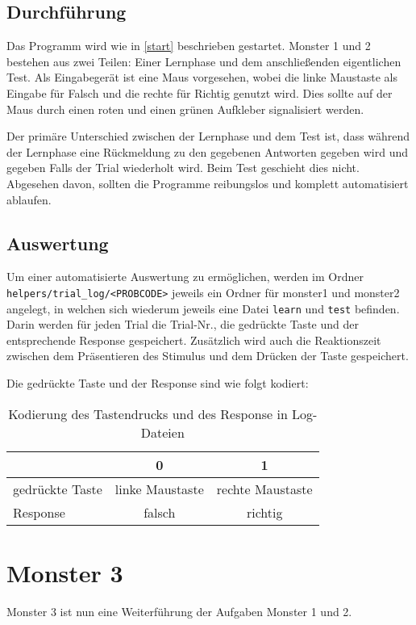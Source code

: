 \documentclass[a4paper]{scrartcl}
\newtheorem[M]{thmL}{Definition}
\begin{document}
\subsection{Durchführung}\label{sub:dur}
Das Programm wird wie in \autoref{start} beschrieben gestartet. Monster 1 und 2 bestehen aus zwei Teilen: Einer Lernphase und dem anschließenden eigentlichen Test. Als Eingabegerät ist eine Maus vorgesehen, wobei die linke Maustaste als Eingabe für Falsch und die rechte für Richtig genutzt wird. Dies sollte auf der Maus durch einen roten und einen grünen Aufkleber signalisiert werden.

Der primäre Unterschied zwischen der Lernphase und dem Test ist, dass während der Lernphase eine Rückmeldung zu den gegebenen Antworten gegeben wird und gegeben Falls der Trial wiederholt wird. Beim Test geschieht dies nicht. Abgesehen davon, sollten die Programme reibungslos und komplett automatisiert ablaufen.

\subsection{Auswertung}\label{sub:m1.aus}
Um einer automatisierte Auswertung zu ermöglichen, werden im Ordner \verb+helpers/trial_log/<PROBCODE>+ jeweils ein Ordner für monster1 und monster2 angelegt, in welchen sich wiederum jeweils eine Datei \verb+learn+ und \verb+test+ befinden. Darin werden für jeden Trial die Trial-Nr., die gedrückte Taste und der entsprechende Response gespeichert. Zusätzlich wird auch die Reaktionszeit zwischen dem Präsentieren des Stimulus und dem Drücken der Taste gespeichert.

Die gedrückte Taste und der Response sind wie folgt kodiert:\\
\begin{table}[h!]
	\begin{center}
		\begin{tabular}{|l|c|c|}
			\hline
			& 0 & 1 \\
			\hline \hline
			gedrückte Taste & linke Maustaste & rechte Maustaste\\
			\hline
			Response & falsch & richtig \\
			\hline
		\end{tabular}
		\caption{Kodierung des Tastendrucks und des Response in Log-Dateien}\label{tab:resp}
	\end{center}
\end{table}

\section{Monster 3}
Monster 3 ist nun eine Weiterführung der Aufgaben Monster 1 und 2.
\end{document}
